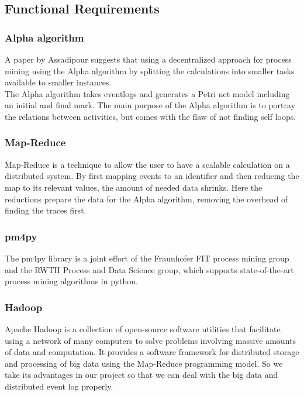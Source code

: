 \documentclass[runningheads]{llncs}
\begin{document}
\subsection{Functional Requirements}

\subsubsection{Alpha algorithm}
A paper by Assadipour\cite{mapReduce} suggests that using a decentralized approach for process mining using the Alpha algorithm by splitting the calculations into smaller tasks available to smaller instances.\\
The Alpha algorithm takes eventlogs and generates a Petri net model including an initial and final mark. The main purpose of the Alpha algorithm is to portray the relations between activities, but comes with the flaw of not finding self loops.

\subsubsection{Map-Reduce}
Map-Reduce is a technique to allow the user to have a scalable calculation on a distributed system. By first mapping events to an identifier and then reducing the map to its relevant values, the amount of needed data shrinks. Here the reductions prepare the data for the Alpha algorithm, removing the overhead of finding the traces first.

\subsubsection{pm4py}
The pm4py library is a joint effort of the Fraunhofer FIT process mining group\cite{FIT} and the RWTH Process and Data Science group\cite{pads}, which supports state-of-the-art process mining algorithms in python. 

\subsubsection{Hadoop}
Apache Hadoop\cite{Hadoop} is a collection of open-source software utilities that facilitate using a network of many computers to solve problems involving massive amounts of data and computation. It provides a software framework for distributed storage and processing of big data using the Map-Reduce programming model. So we take its advantages in our project so that we can deal with the big data and distributed event log properly.
\end{document}
